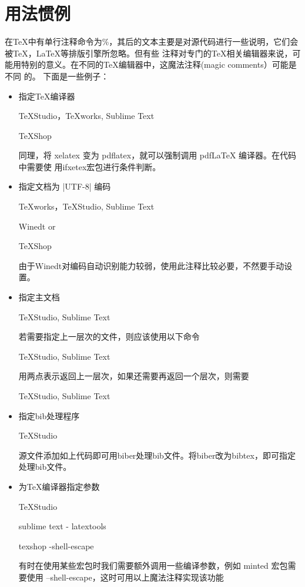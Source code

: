 
\section{用法惯例}



在TeX中有单行注释命令为\%，其后的文本主要是对源代码进行一些说明，它们会被TeX，LaTeX等排版引擎所忽略。但有些
注释对专门的TeX相关编辑器来说，可能用特别的意义。在不同的TeX编辑器中，这魔法注释(magic comments）可能是不同
的。 下面是一些例子：
\begin{itemize}
  \item 指定\TeX{}编译器
  \begin{texlist}
  TeXStudio，TeXworks, Sublime Text
  
  TeXShop
  \end{texlist}

  同理，将 xelatex 变为 pdflatex，就可以强制调用 pdfLaTeX 编译器。在代码中需要使
  用ifxetex宏包进行条件判断。

  \item 指定文档为 |UTF-8| 编码
  \begin{texlist}
  TeXworks，TeXStudio, Sublime Text
  
  Winedt
  or
  
  TeXShop
  \end{texlist}
  由于Winedt对编码自动识别能力较弱，使用此注释比较必要，不然要手动设置。
  \item 指定主文档
  \begin{texlist}
  TeXStudio, Sublime Text
  \end{texlist}
  若需要指定上一层次的文件，则应该使用以下命令
  \begin{texlist}
  TeXStudio, Sublime Text
  \end{texlist}
  用两点表示返回上一层次，如果还需要再返回一个层次，则需要
  \begin{texlist}
  TeXStudio, Sublime Text
  \end{texlist}
  \item 指定bib处理程序
  \begin{texlist}
  TeXStudio
  \end{texlist}
  源文件添加如上代码即可用biber处理bib文件。将biber改为bibtex，即可指定\BibTeX{}处理bib文件。
  \item 
  为\TeX{}编译器指定参数
  \begin{texlist}
  TeXStudio
  
  sublime text - latextools
  
  texshop
  -shell-escape
  \end{texlist}
  有时在使用某些宏包时我们需要额外调用一些编译参数，例如 minted 宏包需要使用 --shell-escape，这时可用以上魔法注释实现该功能
\end{itemize}

